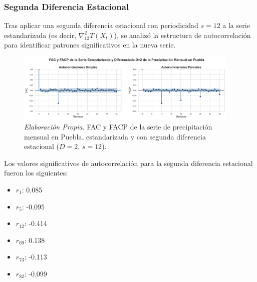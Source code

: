 \documentclass[12pt,letterpaper]{article}   %
\begin{document}
    \subsubsection{Segunda Diferencia Estacional}


Tras aplicar una segunda diferencia estacional con periodicidad $s=12$ a la serie estandarizada (es decir, $\nabla_{12}^2 T(X_t)$), se analizó la estructura de autocorrelación para identificar patrones significativos en la nueva serie.

\begin{figure}[h!]
\centering
\includegraphics[width=0.95\textwidth]{imagenes/03-03-fac-facp-serie-D2.pdf}
\caption{\textit{Elaboración Propia}. FAC y FACP de la serie de precipitación mensual en Puebla, estandarizada y con segunda diferencia estacional ($D=2$, $s=12$).}
\end{figure}

Los valores significativos de autocorrelación para la segunda diferencia estacional fueron los siguientes: \begin{multicols}{5} \scriptsize \begin{itemize} \item $r_1$: 0.085 \item $r_5$: -0.095 \item $r_{12}$: -0.414 \item $r_{69}$: 0.138 \item $r_{73}$: -0.113 \item $r_{82}$: -0.099 \end{itemize} \end{multicols}{}

\vspace{1em}
\end{document}
